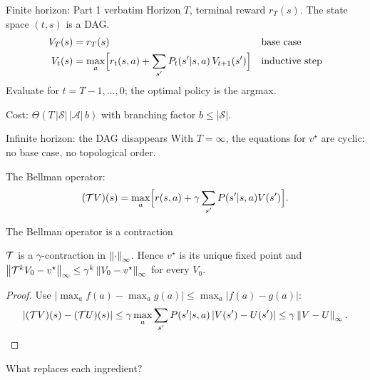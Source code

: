 \begin{frame}{Finite horizon: Part 1 verbatim}
	Horizon $T$, terminal reward $r_T(s)$. The state space $(t,s)$ is a \alert{DAG}.
	\begin{align*}
		V_T(s)&=r_T(s) &&\text{base case}\\
		V_t(s)&=\max_a\Bigl[r_t(s,a)+\sum_{s'}P_t(s'|s,a)\,V_{t+1}(s')\Bigr] &&\text{inductive step}
	\end{align*}
	Evaluate for $t=T-1,\dots,0$; the optimal policy is the argmax.

	\seprule

	Cost: $\Theta(T\,|\mathcal S|\,|\mathcal A|\,b)$ with branching factor $b\le|\mathcal S|$.
\end{frame}

\begin{frame}{Infinite horizon: the DAG disappears}
	With $T=\infty$, the equations for $v^\star$ are cyclic: no base case, no topological order.

	\vspace{0.5em}
	The \alert{Bellman operator}:
	\[
		(\mathcal{T} V)(s)=\max_a\Bigl[r(s,a)+\gamma\sum_{s'}P(s'|s,a)V(s')\Bigr].
	\]
\end{frame}

\begin{frame}{The Bellman operator is a contraction}
	\begin{theorem}
		$\mathcal{T}$ is a $\gamma$-contraction in $\left\lVert \cdot\right\rVert_\infty$. Hence $v^\star$ is its unique fixed point and
		$\left\lVert \mathcal{T}^kV_0-v^\star\right\rVert_\infty\le\gamma^k\left\lVert V_0-v^\star\right\rVert_\infty$ for every $V_0$.
	\end{theorem}
	\begin{proof}
		Use $|\max_af(a)-\max_ag(a)|\le\max_a|f(a)-g(a)|$:
		\[
			|(\mathcal{T} V)(s)-(\mathcal{T} U)(s)|\le\gamma\max_a\sum_{s'}P(s'|s,a)\,|V(s')-U(s')|\le\gamma\left\lVert V-U\right\rVert_\infty.\qedhere
		\]
	\end{proof}
\end{frame}

\begin{frame}{What replaces each ingredient?}
\end{frame}

